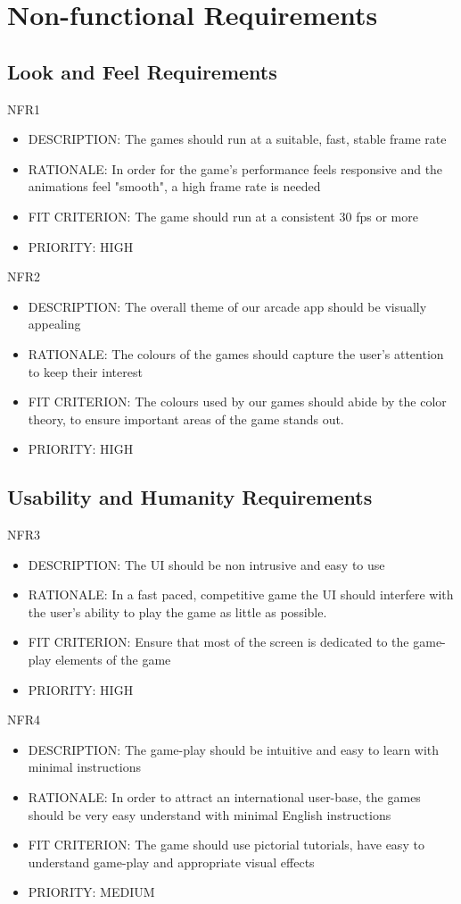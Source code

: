 \documentclass[12pt, titlepage]{article}
\begin{document}
\section{Non-functional Requirements}
\subsection{Look and Feel Requirements}
NFR1
\begin{itemize}
    \item DESCRIPTION: The games should run at a suitable, fast, stable frame rate 
    \item RATIONALE: In order for the game's performance feels responsive and the animations feel "smooth", a high frame rate is needed
    \item FIT CRITERION: The game should run at a consistent 30 fps or more
    \item PRIORITY: HIGH
\end{itemize}

NFR2 
\begin{itemize}
    \item DESCRIPTION: The overall theme of our arcade app should be visually appealing
    \item RATIONALE: The colours of the games should capture the user's attention to keep their interest 
    \item FIT CRITERION: The colours used by our games should abide by the color theory, to ensure important areas of the game stands out.
    \item PRIORITY: HIGH
\end{itemize}


\subsection{Usability and Humanity Requirements}
NFR3
\begin{itemize}
    \item DESCRIPTION: The UI should be non intrusive and easy to use
    \item RATIONALE: In a fast paced, competitive game the UI should interfere with the user's 
ability to play the game as little as possible.
    \item FIT CRITERION: Ensure that most of the screen is dedicated to the game-play elements
of the game
    \item PRIORITY: HIGH
\end{itemize}

NFR4
\begin{itemize}
    \item DESCRIPTION: The game-play should be intuitive and easy to learn with minimal instructions
    \item RATIONALE: In order to attract an international user-base, the games should be very
easy understand with minimal English instructions
    \item FIT CRITERION: The game should use pictorial tutorials, have easy to understand game-play
and appropriate visual effects
    \item PRIORITY: MEDIUM
\end{itemize}
\end{document}
